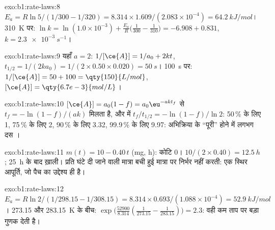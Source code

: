 \begin{solution}{exo:b1:rate-laws:8}
$E_a = R\ln5/(1/300 - 1/320) = 8.314 \times 1.609/(2.083 \times 10^{-4}) =
\qty{64.2}{kJ/mol}$। \qty{310}{K} पर: $\ln k = \ln(1.0 \times 10^{-3}) +
\frac{E_a}{R}\big(\frac{1}{300} - \frac{1}{310}\big) = -6.908 + 0.831$,
$k = \qty{2.3e-3}{s^{-1}}$।
\end{solution}

\begin{solution}{exo:b1:rate-laws:9}
यहाँ $a = 2$: $1/[\ce{A}] = 1/a_0 + 2kt$, $t_{1/2} = 1/(2k a_0) = 1/(2
\times 0.50 \times 0.020) = \qty{50}{s}$। \qty{100}{s} पर: $1/[\ce{A}] = 50
+ 100 = \qty{150}{L/mol}$, $[\ce{A}] = \qty{6.7e-3}{mol/L}$।
\end{solution}

\begin{solution}{exo:b1:rate-laws:10}
$[\ce{A}] = a_0(1 - f) = a_0\eu^{-akt_f}$ से $t_f = -\ln(1-f)/(ak)$ मिलता है, और
 में $t_f/t_{1/2} = -\ln(1-f)/\ln2$: 50\,\% के लिए 1, 75\,\% के लिए 2,
90\,\% के लिए 3.32, 99.9\,\% के लिए 9.97: अभिक्रिया के ``पूरी'' होने में लगभग दस
।
\end{solution}

\begin{solution}{exo:b1:rate-laws:11}
$m(t) = 10 - 0.40\,t$ (\unit{mg}, \unit{h}): कोटि 0। 
$10/(2 \times 0.40) = \qty{12.5}{h}$; \qty{25}{h} के बाद ख़ाली। प्रति घंटे दी जाने वाली
मात्रा बची हुई मात्रा पर निर्भर नहीं करती: एक स्थिर आपूर्ति, जो
पैच का उद्देश्य ही है।
\end{solution}

\begin{solution}{exo:b1:rate-laws:12}
$E_a = R\ln2/(1/298.15 - 1/308.15) = 8.314 \times 0.693/(1.088 \times
10^{-4}) = \qty{52.9}{kJ/mol}$। 273.15 और \qty{283.15}{K} के बीच:
$\exp\big(\frac{52900}{8.314}(\frac{1}{273.15} - \frac{1}{283.15})\big) =
2.3$: वही  कम ताप पर बड़ा गुणक देती है।
\end{solution}

